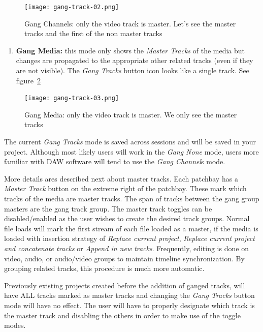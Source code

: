 \begin{figure}[htpb]
	\centering
	\texttt{[image: gang-track-02.png]}
	\caption{Gang Channels: only the video track is master. Let's see the master tracks and the first of the non master tracks}
	\label{fig:gang-track-02}
\end{figure}

\begin{enumerate}[start=3]
	\item \textbf{Gang Media:} this mode only shows the \textit{Master Tracks} of the media but changes are propagated to the appropriate other related tracks (even if they are not visible). The \textit{Gang Tracks} button icon looks like a single track. See figure~\ref{fig:gang-track-03}
\end{enumerate}

\begin{figure}[htpb]
	\centering
	\texttt{[image: gang-track-03.png]}
	\caption{Gang Media: only the video track is master. We only see the master tracks}
	\label{fig:gang-track-03}
\end{figure}

The current \textit{Gang Tracks} mode is saved across sessions and will be saved in your project. Although most likely users will work in the \textit{Gang None} mode, users more familiar with DAW software will tend to use the \textit{Gang Channel}s mode.

More details ares described next about master tracks. Each patchbay has a \textit{Master Track} button on the extreme right of the patchbay. These mark which tracks of the media are master tracks. The span of tracks between the gang group masters are the gang track group. The master track toggles can be disabled/enabled as the user wishes to create the desired track groups. Normal file loads will mark the first stream of each file loaded as a master, if the media is loaded with insertion strategy of\textit{ Replace current project}, \textit{Replace current project and concatenate tracks} or \textit{Append in new tracks}. Frequently, editing is done on video, audio, or audio/video groups to maintain timeline synchronization. By grouping related tracks, this procedure is much more automatic.

Previously existing projects created before the addition of ganged tracks, will have ALL tracks marked as master tracks and changing the \textit{Gang Tracks} button mode will have no effect. The user will have to properly designate which track is the master track and disabling the others in order to make use of the toggle modes.

